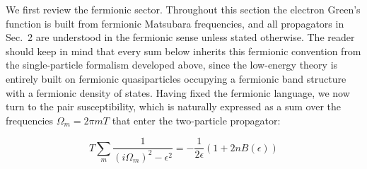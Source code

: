 \documentclass{article}
\begin{document}
We first review the fermionic sector. Throughout this section the electron
Green's function is built from fermionic Matsubara frequencies, and all
propagators in Sec.~2 are understood in the fermionic sense unless stated
otherwise. The reader should keep in mind that every sum below inherits this
fermionic convention from the single-particle formalism developed above,
since the low-energy theory is entirely built on fermionic quasiparticles
occupying a fermionic band structure with a fermionic density of states.
Having fixed the fermionic language, we now turn to the pair susceptibility,
which is naturally expressed as a sum over the frequencies $\Omega_m =
2\pi m T$ that enter the two-particle propagator:

\begin{equation}
T\sum_{m} \frac{1}{(i\Omega_m)^2 - \epsilon^2} = -\frac{1}{2\epsilon}\left(1 + 2 nB(\epsilon)\right)
\end{equation}
\end{document}
